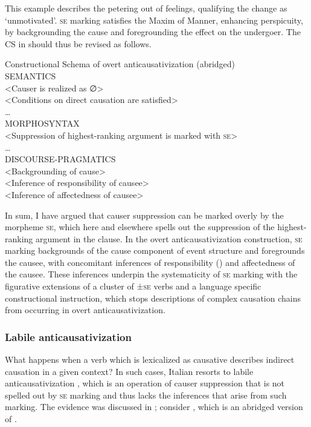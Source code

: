 \documentclass[output=paper,colorlinks,citecolor=brown
]{langscibook}
\begin{document}
This example describes the petering out of feelings, qualifying the change as ‘unmotivated’. \textsc{se} marking satisfies the Maxim of Manner, enhancing perspicuity, by backgrounding the cause and foregrounding the effect on the undergoer. The CS in  should thus be revised as follows.

\ea \label{bentley_example_58}
Constructional Schema of overt anticausativization (abridged)\\
SEMANTICS\\
<Causer is realized as ∅>\\
<Conditions on direct causation are satisfied>\\
 \ldots \\
MORPHOSYNTAX\\
<Suppression of highest-ranking argument is marked with \textsc{se}>\\
 \ldots \\
DISCOURSE-PRAGMATICS\\
<Backgrounding of cause>\\
<Inference of responsibility of causee>\\
<Inference of affectedness of causee>\\
\z

In sum, I have argued that causer suppression can be marked overly by the morpheme \textsc{se}, which here and elsewhere spells out the suppression of the highest-ranking argument in the clause. In the overt anticausativization construction, \textsc{se} marking backgrounds of the cause component of event structure and foregrounds the causee, with concomitant inferences of responsibility (\cites[24 and references therein]{zribi1987reflexivite}{kailuweit2012construcciones}{martin2014anticausatives}) and affectedness \citep{lyons1969introduction} of the causee. These inferences underpin the systematicity of \textsc{se} marking with the figurative extensions of a cluster of ±\textsc{se} verbs and a language specific constructional instruction, which stops descriptions of complex causation chains from occurring in overt anticausativization. 

\subsubsection{Labile anticausativization}
\label{bentley_section_5.4.2}
What happens when a verb which is lexicalized as causative describes indirect causation in a given
context? In such cases, Italian resorts to labile anticausativization \citep{bentley2021two}, which
is an operation of causer suppression that is not spelled out by \textsc{se} marking and thus lacks
the inferences that arise from such marking. The evidence was discussed in ; consider , which is an abridged version of . 
\end{document}
